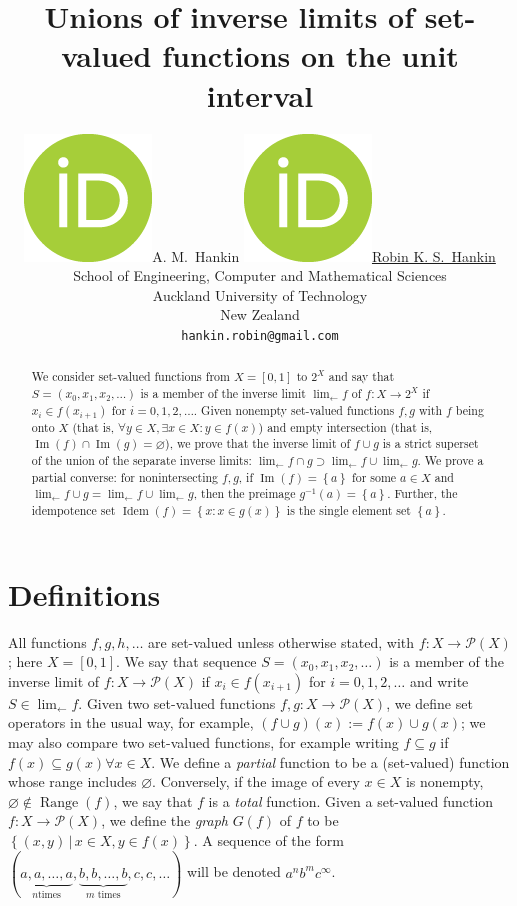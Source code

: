 \documentclass{article}
\title{Unions of inverse limits of set-valued functions on the unit interval}
\author{{\includegraphics[scale=0.06]{orcid.png}\hspace{1mm}A. M.~Hankin}
	\And 
	\href{https://orcid.org/0000-0001-5982-0415}{\includegraphics[scale=0.06]{orcid.png}\hspace{1mm}Robin K. S.~Hankin} \\
	School of Engineering, Computer and Mathematical Sciences\\
	Auckland University of Technology\\
        New Zealand\\
	\texttt{hankin.robin@gmail.com} \\
}
\theoremstyle{definition}
\let\emptyset\varnothing
\begin{document}
\maketitle

\newcommand{\invlim}[1]{\lim_{\leftarrow} #1}

\begin{abstract}
We consider set-valued functions from $X=\left[0,1\right]$ to $2^X$
and say that $S = (x_0 , x_1 , x_2 , \ldots)$ is a member of the
inverse limit $\invlim{f}$ of $f\colon X\longrightarrow 2^X$ if $x_i
\in f(x_{i+1})$ for $i = 0, 1, 2, \ldots$.  Given nonempty set-valued
functions $f,g$ with $f$ being onto $X$ (that is, $\forall y\in X,
\exists x\in X\colon y\in f(x)$) and empty intersection (that is,
$\operatorname{Im}(f)\cap\operatorname{Im}(g) = \emptyset$), we prove
that the inverse limit of $f\cup g$ is a strict superset of the union
of the separate inverse limits: $\invlim{f\cap g}
\supset\invlim{f}\cup\invlim{g}$.  We prove a partial converse: for
nonintersecting $f,g$, if $\operatorname{Im}(f)=\left\lbrace
a\right\rbrace$ for some $a\in X$ and $\invlim{f\cup g} =
\invlim{f}\cup\invlim{g$}, then the preimage $g^{-1}(a)=\left\lbrace
a\right\rbrace$.  Further, the idempotence set
$\operatorname{Idem}(f)=\left\lbrace x\colon x\in g(x)\right\rbrace$
is the single element set $\left\lbrace a\right\rbrace$.
\end{abstract}




\section{Definitions}

All functions $f,g,h,\ldots$ are set-valued unless otherwise stated,
with $f\colon X\longrightarrow\mathcal{P}(X)$; here $X=[0,1]$.  We say
that sequence $S = (x_0 , x_1 , x_2 ,\ldots)$ is a member of the
inverse limit of $f\colon X\longrightarrow \mathcal{P}(X)$ if $x_i \in
f(x_{i+1})$ for $i = 0, 1, 2,\ldots$ and write
$S\in\lim_{\leftarrow}f$.  Given two set-valued functions $f,g\colon X
\rightarrow \mathcal{P}(X)$, we define set operators in the usual way,
for example, $(f\cup g)(x) := f(x)\cup g(x)$; we may also compare two
set-valued functions, for example writing $f\subseteq g$ if
$f(x)\subseteq g(x)\forall x\in X$.  We define a {\em partial}
function to be a (set-valued) function whose range includes
$\emptyset$.  Conversely, if the image of every $x\in X$ is nonempty,
$\emptyset\not\in\operatorname{Range}(f)$, we say that $f$ is a {\em
  total} function.  Given a set-valued function $f\colon X
\longrightarrow \mathcal{P}(X)$, we define the {\em graph} $G(f)$ of
$f$ to be $\left\lbrace (x, y) \,|\, x\in X,y \in f(x)\right\rbrace$.
A sequence of the form $( \underbrace{a, a,\ldots, a}_{\text{$n$
    times}}, \underbrace{b, b,\ldots, b}_{\text{$m$ times}},
c,c,\ldots)$ will be denoted $a^nb^mc^\infty$.
\end{document}
